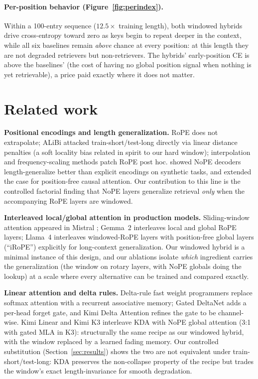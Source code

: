 \documentclass[10pt]{article}
\begin{document}
\paragraph{Per-position behavior (Figure~\ref{fig:perindex}).} Within a
100-entry sequence ($12.5\times$ training length), both windowed hybrids
drive cross-entropy toward zero as keys begin to repeat deeper in the
context, while all six baselines remain \emph{above} chance at every position: at this length they are not degraded retrievers but
non-retrievers. The hybrids' early-position CE is above the baselines'
(the cost of having no global position signal when nothing is yet
retrievable), a price paid exactly where it does not matter.

\section{Related work}

\textbf{Positional encodings and length generalization.} RoPE
\citep{su2021roformer} does not extrapolate; ALiBi \citep{press2021train}
attacked train-short/test-long directly via linear distance penalties
(a soft locality bias related in spirit to our hard window);
interpolation and frequency-scaling methods
\citep{chen2023extending,peng2023yarn} patch RoPE post hoc.
\citet{kazemnejad2023impact} showed NoPE decoders length-generalize
better than explicit encodings on synthetic tasks, and
\citet{wang2024length} extended the case for position-free causal
attention. Our contribution to this line is the controlled factorial
finding that NoPE layers generalize retrieval \emph{only} when the
accompanying RoPE layers are windowed.

\textbf{Interleaved local/global attention in production models.}
Sliding-window attention appeared in Mistral \citep{jiang2023mistral};
Gemma~2 \citep{gemmateam2024gemma2} interleaves local and global RoPE
layers; Llama~4 \citep{meta2025llama4} interleaves windowed-RoPE layers
with position-free global layers (``iRoPE'') explicitly for long-context
generalization. Our windowed hybrid is a minimal instance of this design,
and our ablations isolate \emph{which} ingredient carries the
generalization (the window on rotary layers, with NoPE globals doing the
lookup) at a scale where every alternative can be trained and compared
exactly.

\textbf{Linear attention and delta rules.} Delta-rule fast weight
programmers \citep{schlag2021linear} replace softmax attention with a
recurrent associative memory; Gated DeltaNet \citep{yang2024gated} adds
a per-head forget gate, and Kimi Delta Attention
\citep{kimiteam2025linear} refines the gate to be channel-wise. Kimi
Linear and Kimi K3 \citep{kimiteam2026k3} interleave KDA with NoPE
global attention (3:1 with gated MLA in K3): structurally the same
recipe as our windowed hybrid, with the window replaced by a learned
fading memory. Our controlled substitution (Section~\ref{sec:results})
shows the two are not equivalent under train-short/test-long: KDA
preserves the non-collapse property of the recipe but trades the
window's exact length-invariance for smooth degradation.
\end{document}
